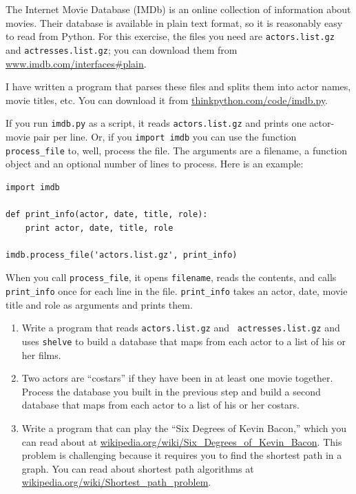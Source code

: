 \documentclass[10pt]{book}
\begin{document}
\begin{ex}


The Internet Movie Database (IMDb) is an online collection of
information about movies.  Their database is available
in plain text format, so it is reasonably easy to read from
Python.  For this exercise, the files you need
are {\tt actors.list.gz} and {\tt actresses.list.gz}; you
can download them from \url{www.imdb.com/interfaces#plain}.


I have written a program that parses these files and
splits them into actor names, movie titles, etc.  You can
download it from \url{thinkpython.com/code/imdb.py}.

If you run {\tt imdb.py} as a script, it reads {\tt actors.list.gz}
and prints one actor-movie pair per line.  Or, if you {\tt import
imdb} you can use the function \verb"process_file" to, well,
process the file.  The arguments are a filename, a function
object and an optional number of lines to process.  Here is
an example:

\beforeverb
\begin{verbatim}
import imdb

def print_info(actor, date, title, role):
    print actor, date, title, role

imdb.process_file('actors.list.gz', print_info)
\end{verbatim}
\afterverb

When you call \verb"process_file", it opens {\tt filename}, reads the
contents, and calls \verb"print_info" once for each line in the file.
\verb"print_info" takes an actor, date, movie title and role as
arguments and prints them.

\begin{enumerate}

\item Write a program that reads {\tt actors.list.gz} and {\tt
  actresses.list.gz} and uses {\tt shelve} to build a database
that maps from each actor to a list of his or her films.


\item Two actors are ``costars'' if they have been in at least one
  movie together.  Process the database you built in the previous step
  and build a second database that maps from each actor to a list of
  his or her costars.


\item Write a program that can play the ``Six Degrees of Kevin
  Bacon,'' which you can read about at
  \url{wikipedia.org/wiki/Six_Degrees_of_Kevin_Bacon}.  This
problem is challenging because it requires you to find the shortest
path in a graph.  You can read about shortest path algorithms
at \url{wikipedia.org/wiki/Shortest_path_problem}.

\end{enumerate}

\end{ex}
\end{document}
